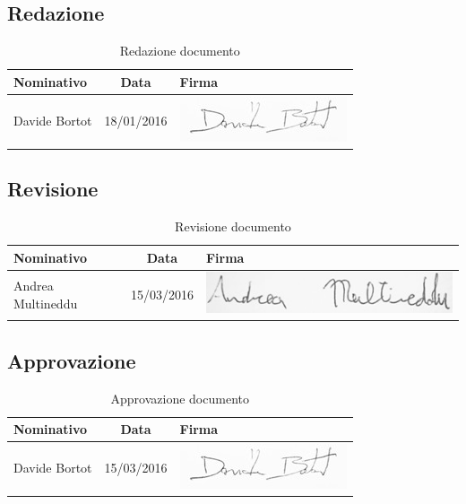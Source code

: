 \documentclass[a4paper,11pt]{article}
\begin{document}
	\subsection*{Redazione}
	\begin{table}[h!]
		\begin{tabularx}{\textwidth}{XcX}
			\textbf{Nominativo} & \textbf{Data} &\hspace{20 mm}  \textbf{Firma}\\
			\midrule
			Davide Bortot & 18/01/2016 & \hspace{20 mm} \includegraphics[scale=0.35]{../Firme/db.jpg} \\
			\midrule
		\end{tabularx}
	\caption{Redazione documento}
	\end{table}

	\subsection*{Revisione}
	\begin{table}[h!]
		\begin{tabularx}{\textwidth}{XcX}
			\textbf{Nominativo} & \textbf{Data} &\hspace{20 mm}  \textbf{Firma}\\
			\midrule
			Andrea Multineddu & 15/03/2016 & \hspace{20 mm} \includegraphics[scale=0.3]{../Firme/multi.jpg} \\
			\bottomrule
		\end{tabularx}
	\caption{Revisione documento}
	\end{table}
	
	\subsection*{Approvazione}
	\begin{table}[h!]
		\begin{tabularx}{\textwidth}{XcX}
			\textbf{Nominativo} & \textbf{Data} &\hspace{20 mm}  \textbf{Firma}\\
			\midrule
			Davide Bortot & 15/03/2016 & \hspace{20 mm} \includegraphics[scale=0.35]{../Firme/db.jpg} \\ 
			\bottomrule
		\end{tabularx}
	\caption{Approvazione documento}
	\end{table}
\end{document}
